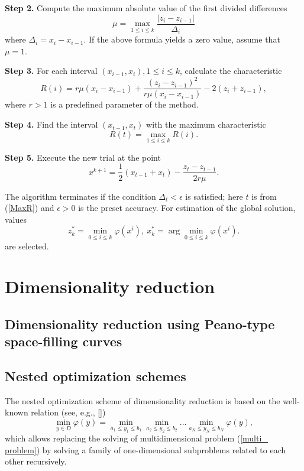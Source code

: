 \documentclass[runningheads]{llncs}
\begin{document}
\textbf{Step 2.} Compute the maximum absolute value of the first divided 
differences 
\begin{displaymath}
\mu=\max_{1\leq i\leq k}\frac{\left|z_i-z_{i-1}\right|}{\Delta_i}
\end{displaymath}
where $\Delta_i = x_i-x_{i-1}$. If the above formula yields a zero value, 
assume that $\mu = 1$.


\textbf{Step 3.} For each interval $(x_{i-1},x_i),1\leq i\leq k$,  calculate 
the characteristic
\begin{displaymath}
R(i)=r\mu(x_i-x_{i-1})+\frac{(z_i-z_{i-1})^2}{r\mu(x_i-x_{i-1})}-2(z_i+z_{i-1}
),
\end{displaymath} 
where $r>1$ is a predefined parameter of the method. 

\textbf{Step 4.} Find the interval $(x_{t-1},x_t)$ with the maximum 
characteristic
\begin{equation}\label{MaxR}
R(t)=\max_{1\leq i\leq {k}}R(i).
\end{equation}  

\textbf{Step 5.} Execute the new trial at the point 
\begin{displaymath}
x^{k+1}=\frac{1}{2}(x_{t-1}+x_t) - \frac{z_t-z_{t-1}}{2r\mu}.
\end{displaymath}

The algorithm terminates if the condition $\Delta_t<\epsilon$ is satisfied; 
here $t$ is from (\ref{MaxR}) and $\epsilon>0$ is the preset accuracy. For 
estimation of the global solution, values
\[
z_k^\ast=\min_{0\leq i \leq k}\varphi(x^i), \ x_k^\ast=\arg \min_{0\leq i \leq
 k}\varphi(x^i).
\]
are selected.

\section{Dimensionality reduction}
\subsection{Dimensionality reduction using Peano-type space-filling curves}


\subsection{Nested optimization schemes}

The nested optimization scheme of dimensionality reduction is based on the 
well-known relation (see, e.g., [])
\begin{equation}\label{nested}
\min_{y \in D}\varphi(y) = \min_{a_1\leq y_1 \leq b_1}\min_{a_2\leq y_2 \leq 
b_2}...\min_{a_N\leq y_N \leq b_N}\varphi(y),
\end{equation}
which allows replacing the solving of multidimensional problem (\ref{multi_
problem}) by solving a family of one-dimensional subproblems related to each 
other recursively.
\end{document}
